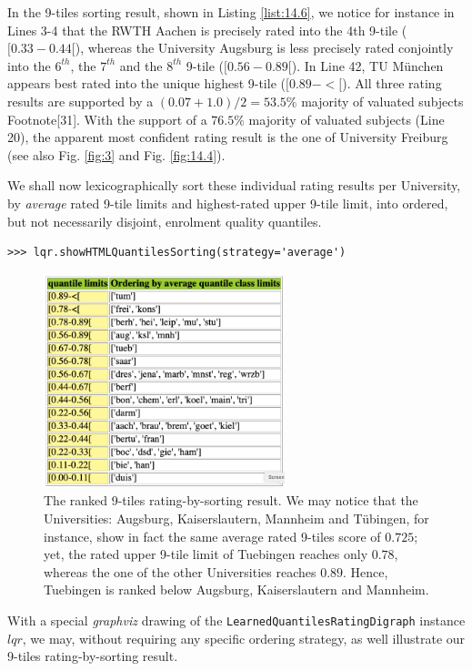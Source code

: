 In the 9-tiles sorting result, shown in Listing \ref{list:14.6}, we notice for instance in Lines 3-4 that the RWTH Aachen is precisely rated into the 4th 9-tile ($[0.33 - 0.44[$), whereas the University Augsburg is less precisely rated conjointly into the $6^{th}$, the $7^{th}$ and the $8^{th}$ 9-tile ($[0.56 - 0.89[$). In Line 42, TU München appears best rated into the unique highest 9-tile ($[0.89 - <[$). All three rating results are supported by a $(0.07 + 1.0)/2 = 53.5\%$ majority of valuated subjects Footnote[31]. With the support of a $76.5\%$ majority of valuated subjects (Line 20), the apparent most confident rating result is the one of University Freiburg (see also Fig. \ref{fig:3} and Fig. \ref{fig:14.4}). 

We shall now lexicographically sort these individual rating results per University, by \emph{average} rated 9-tile limits and highest-rated upper 9-tile limit, into ordered, but not necessarily disjoint, enrolment quality quantiles.

\begin{lstlisting}
>>> lqr.showHTMLQuantilesSorting(strategy='average')
\end{lstlisting}

\begin{figure}[h]
\sidecaption
\includegraphics[width=7cm]{Figures/nineTilingOrdering.png}
\caption{The ranked 9-tiles rating-by-sorting result. We may notice that the Universities: Augsburg, Kaiserslautern, Mannheim and Tübingen, for instance, show in fact the same average rated 9-tiles score of $0.725$; yet, the rated upper 9-tile limit of Tuebingen reaches only $0.78$, whereas the one of the other Universities reaches $0.89$. Hence, Tuebingen is ranked below Augsburg, Kaiserslautern and Mannheim.}
\label{fig:14.6}       %
\end{figure}

With a special \emph{graphviz} drawing of the \texttt{LearnedQuantilesRatingDigraph} instance $lqr$, we may, without requiring any specific ordering strategy, as well illustrate our 9-tiles rating-by-sorting result.


